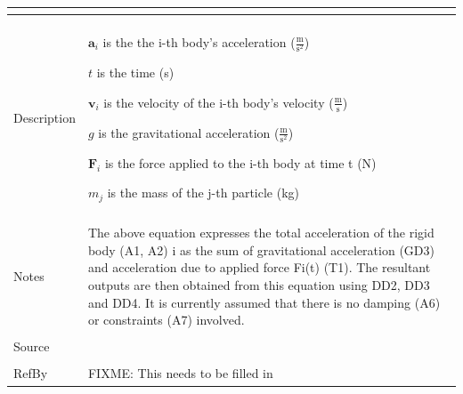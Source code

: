 \documentclass[12pt]{article}
\begin{document}
\begin{minipage}{\textwidth}
\begin{tabular}{p{} p{}}
\begin{dmath}
           \end{dmath}
\\ \midrule \\
Description & \begin{symbDescription}
              \item{${\mathbf{a}_{i}}$ is the the i-th body's acceleration ($\frac{\text{m}}{\text{s}^{2}}$)}
              \item{$t$ is the time (s)}
              \item{${\mathbf{v}_{i}}$ is the velocity of the i-th body's velocity ($\frac{\text{m}}{\text{s}}$)}
              \item{$g$ is the gravitational acceleration ($\frac{\text{m}}{\text{s}^{2}}$)}
              \item{${\mathbf{F}_{i}}$ is the force applied to the i-th body at time t (N)}
              \item{${m_{j}}$ is the mass of the j-th particle (kg)}
              \end{symbDescription}
\\ \midrule \\
Notes & The above equation expresses the total acceleration of the rigid body (A1, A2) i as the sum of gravitational acceleration (GD3) and acceleration due to applied force Fi(t) (T1). The resultant outputs are then obtained from this equation using DD2, DD3 and DD4. It is currently assumed that there is no damping (A6) or constraints (A7) involved.
\\ \midrule \\
Source & 
\\ \midrule \\
RefBy & FIXME: This needs to be filled in
\\ \bottomrule \end{tabular}
\end{minipage}\\
~\newline
\end{document}
